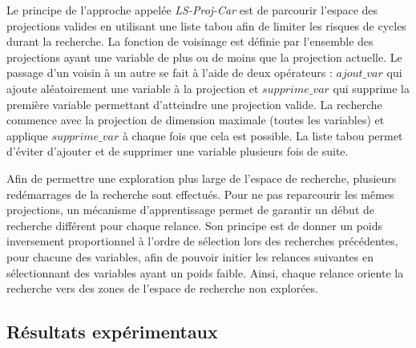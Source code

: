 Le principe de l'approche appelée \emph{LS-Proj-Car} est de parcourir l'espace des projections valides en utilisant une liste tabou \cite{Glover1997} afin de limiter les risques de cycles durant la recherche. La fonction de voisinage est définie par l'ensemble des projections ayant une variable de plus ou de moins que la projection actuelle. Le passage d'un voisin à un autre se fait à l'aide de deux opérateurs : $ajout\_var$ qui ajoute aléatoirement une variable à la projection et $supprime\_var$ qui supprime la première variable permettant d'atteindre une projection valide. La recherche commence avec la projection de dimension maximale (toutes les variables) et applique $supprime\_var$ à chaque fois que cela est possible. La liste tabou permet d'éviter d'ajouter et de supprimer une variable plusieurs fois de suite.

Afin de permettre une exploration plus large de l'espace de recherche, plusieurs redémarrages de la recherche sont effectués. Pour ne pas reparcourir les mêmes projections, un mécanisme d'apprentissage permet de garantir un début de recherche différent pour chaque relance. Son principe est de donner un poids inversement proportionnel à l'ordre de sélection lors des recherches précédentes, pour chacune des variables, afin de pouvoir initier les relances suivantes en sélectionnant des variables ayant un poids faible. Ainsi, chaque relance oriente la recherche vers des zones de l'espace de recherche non explorées.
\subsection{Résultats expérimentaux}














